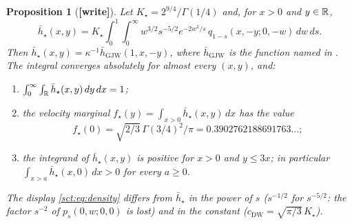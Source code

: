 \documentclass[11pt,letterpaper]{article}
\newtheorem{proposition}[theorem]{Proposition}
\theoremstyle{definition}\newtheorem{remark}[theorem]{Remark}
\newcommand{\hstar}{\bar h_\star}\newcommand{\fstar}{f_\star}\newcommand{\Kstar}{K_\star}
\newcommand{\wtag}{\textup{\textbf{[write]}}}
\begin{document}
\begin{proposition}[\wtag]\label{sct:prop:corrected}
Let $\Kstar=2^{9/4}/\Gamma(1/4)$ and, for $x>0$ and $y\in\mathbb R$,
\[
 \hstar(x,y)=\Kstar\int_0^1\int_0^\infty
 w^{3/2}s^{-5/2}e^{-2w^2/s}\,q_{1-s}(x,-y;0,-w)\,dw\,ds .
\]
Then $\hstar(x,y)=\kappa^{-1}\bar h_{\mathrm{GJW}}(1,x,-y)$, where $\bar h_{\mathrm{GJW}}$ is the function \cite[(2.24)]{gjw} named in \cite[Remark~2]{dw}. The integral converges absolutely for almost every $(x,y)$, and:
\begin{enumerate}
\item[(a)] $\int_0^\infty\int_\R\hstar(x,y)\,dy\,dx=1$;
\item[(b)] the velocity marginal $\fstar(y)=\int_{x>0}\hstar(x,y)\,dx$ has the value
 \[\fstar(0)=\sqrt{2/3}\,\Gamma(3/4)^2/\pi=0.3902762188691763\ldots;\]
\item[(c)] the integrand of $\hstar(x,y)$ is positive for $x>0$ and $y\le3x$; in particular $\int_{x>a}\hstar(x,0)\,dx>0$ for every $a\ge0$.
\end{enumerate}
The display \eqref{sct:eq:density} differs from $\hstar$ in the power of $s$ ($s^{-1/2}$ for $s^{-5/2}$: the factor $s^{-2}$ of $p_s(0,w;0,0)$ is lost) and in the constant ($c_{\mathrm{DW}}=\sqrt{\pi/3}\,\Kstar$).
\end{proposition}
\end{document}
